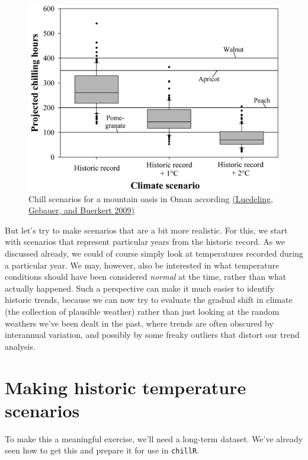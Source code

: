 \documentclass[
]{book}
\begin{document}
\begin{figure}
\centering
\includegraphics{pictures/Luedeling_JPG_Figure_10_Future_chilling.JPG}
\caption{Chill scenarios for a mountain oasis in Oman according \href{http://link.springer.com/10.1007/s10584-009-9581-7}{(Luedeling, Gebauer, and Buerkert \protect\hyperlink{ref-luedeling_climate_2009}{2009})}}
\end{figure}

But let's try to make scenarios that are a bit more realistic. For this, we start with scenarios that represent particular years from the historic record. As we discussed already, we could of course simply look at temperatures recorded during a particular year. We may, however, also be interested in what temperature conditions should have been considered \emph{normal} at the time, rather than what actually happened. Such a perspective can make it much easier to identify historic trends, because we can now try to evaluate the gradual shift in climate (the collection of plausible weather) rather than just looking at the random weathers we've been dealt in the past, where trends are often obscured by interannual variation, and possibly by some freaky outliers that distort our trend analysis.

\hypertarget{making-historic-temperature-scenarios}{%
\section{Making historic temperature scenarios}\label{making-historic-temperature-scenarios}}

To make this a meaningful exercise, we'll need a long-term dataset. We've already seen how to get this and prepare it for use in \texttt{chillR}.
\end{document}
